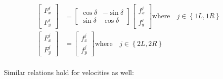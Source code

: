 \documentclass[paper=a4, fontsize=11pt]{scrartcl} %
\numberwithin{equation}{section} %
\numberwithin{figure}{section} %
\numberwithin{table}{section} %
\begin{document}
\begin{align}
\begin{bmatrix}
F^j_x  \label{forcesConversion1}\\
F^j_y
\end{bmatrix} & = \begin{bmatrix}
\cos\delta & -\sin\delta \\
\sin\delta & \cos\delta
\end{bmatrix} \begin{bmatrix}
f^j_x \\
f^j_y
\end{bmatrix}
\text{where}  \quad j \in \left\{ {1L,1R}\right\} \\
\begin{bmatrix}
F^j_x \\
F^j_y
\end{bmatrix} & = \begin{bmatrix}
f^j_x \\
f^j_y
\end{bmatrix}
\text{where}  \quad j \in \left\{ {2L,2R}\right\} \label{forcesConversion3} \\
\end{align}

Similar relations hold for velocities as well:
\end{document}
